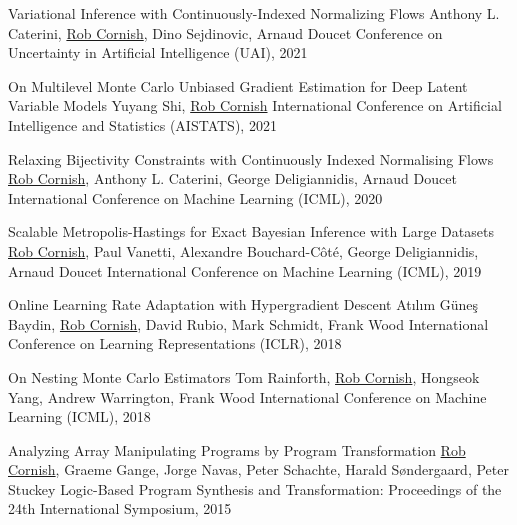 \documentclass[9pt]{developercv} %
\begin{document}
\begin{entrylist}
    \publication
        {Variational Inference with Continuously-Indexed Normalizing Flows}
        {Anthony L. Caterini, \underline{Rob Cornish}, Dino Sejdinovic, Arnaud Doucet}
        {Conference on Uncertainty in Artificial Intelligence (UAI), 2021}

    \publication
        {On Multilevel Monte Carlo Unbiased Gradient Estimation for Deep Latent Variable Models}
        {Yuyang Shi, \underline{Rob Cornish}}
        {International Conference on Artificial Intelligence and Statistics (AISTATS), 2021}

    \publication
        {Relaxing Bijectivity Constraints with Continuously Indexed Normalising Flows}
        {\underline{Rob Cornish}, Anthony L. Caterini, George Deligiannidis, Arnaud Doucet}
        {International Conference on Machine Learning (ICML), 2020}

    \publication
        {Scalable Metropolis-Hastings for Exact Bayesian Inference with Large Datasets}
        {\underline{Rob Cornish}, Paul Vanetti, Alexandre Bouchard-C\^ot\'e, George Deligiannidis, Arnaud Doucet}
        {International Conference on Machine Learning (ICML), 2019}

    \publication
        {Online Learning Rate Adaptation with Hypergradient Descent}
        {At\i l\i m G\"une\c s Baydin, \underline{Rob Cornish}, David Rubio, Mark Schmidt, Frank Wood}
        {International Conference on Learning Representations (ICLR), 2018}

    \publication
        {On Nesting Monte Carlo Estimators}
        {Tom Rainforth, \underline{Rob Cornish}, Hongseok Yang, Andrew Warrington, Frank Wood}
        {International Conference on Machine Learning (ICML), 2018}

    \publication
        {Analyzing Array Manipulating Programs by Program Transformation}
        {\underline{Rob Cornish}, Graeme Gange, Jorge Navas, Peter Schachte, Harald S\o ndergaard, Peter Stuckey}
        {Logic-Based Program Synthesis and Transformation: Proceedings of the 24th International Symposium, 2015}
\end{entrylist}

\end{document}

